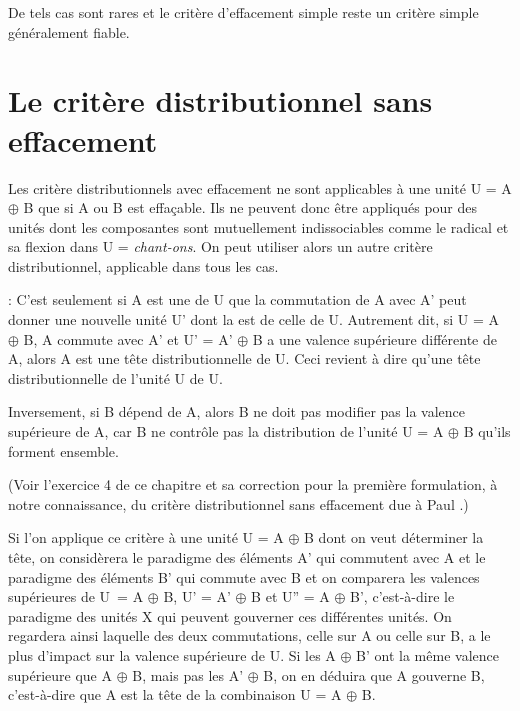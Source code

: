 {   De tels cas sont rares et le critère d’effacement simple reste un critère simple généralement fiable.
}
\section{Le critère distributionnel sans effacement}\label{sec:3.3.13}

Les critère distributionnels avec effacement ne sont applicables à une unité U = A ${\oplus}$ B que si A ou B est effaçable. Ils ne peuvent donc être appliqués pour des unités dont les composantes sont mutuellement indissociables comme le radical et sa flexion dans U = \textit{chant-ons}. On peut utiliser alors un autre critère distributionnel, applicable dans tous les cas.

{ : C’est seulement si A est une  de U que la commutation de A avec A’ peut donner une nouvelle unité U’ dont la  est  de celle de U. Autrement dit, si U = A ${\oplus}$ B, A commute avec A’ et U’ = A’ ${\oplus}$ B a une valence supérieure différente de A, alors A est une tête distributionnelle de U. Ceci revient à dire qu'une tête distributionnelle de l'unité U  de U.

\indent Inversement, si B dépend de A, alors B ne doit pas modifier pas la valence supérieure de A, car B ne contrôle pas la distribution de l'unité U = A ${\oplus}$ B qu'ils forment ensemble.}

\noindent (Voir l’exercice 4 de ce chapitre et sa correction pour la première formulation, à notre connaissance, du critère distributionnel sans effacement due à Paul \citealt{garde1977ordre}.) 

Si l’on applique ce critère à une unité U = A ${\oplus}$ B dont on veut déterminer la tête, on considèrera le paradigme des éléments A’ qui commutent avec A et le paradigme des éléments B’ qui commute avec B et on comparera les valences supérieures de U~= A ${\oplus}$ B, U’ = A’ ${\oplus}$ B et U” = A ${\oplus}$ B’, c’est-à-dire le paradigme des unités X qui peuvent gouverner ces différentes unités.
On regardera ainsi laquelle des deux commutations, celle sur A ou celle sur B, a le plus d’impact sur la valence supérieure de U. Si les A ${\oplus}$ B’ ont la même valence supérieure que A ${\oplus}$ B, mais pas les A’ ${\oplus}$ B, on en déduira que A gouverne B, c’est-à-dire que A est la tête de la combinaison U = A ${\oplus}$ B.

